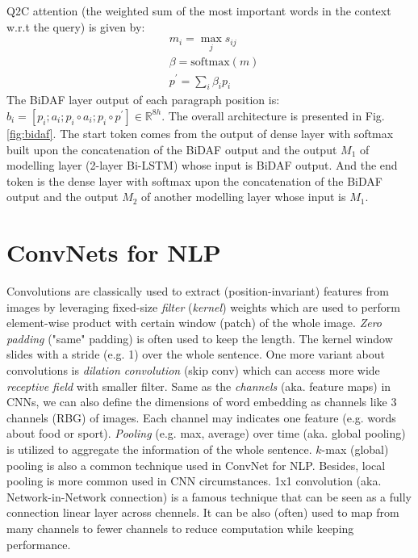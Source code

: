 Q2C attention (the weighted sum of the most important words in the context w.r.t the query) is given by:
\begin{align}
&m_i = \max_j s_{ij} \\
&\beta = \text{softmax}(m) \\
&p^\prime = \sum_i \beta_i p_i
\end{align}
The BiDAF layer output of each paragraph position is: $b_i = [p_i; a_i; p_i \circ a_i; p_i \circ p^\prime] \in \mathbb{R}^{8h}$.
The overall architecture is presented in Fig.\ref{fig:bidaf}.
The start token comes from the output of dense layer with softmax built upon the concatenation of the BiDAF output and the output $M_1$ of modelling layer (2-layer Bi-LSTM) whose input is BiDAF output.
And the end token is the dense layer with softmax upon the concatenation of the BiDAF output and the output $M_2$ of another modelling layer whose input is $M_1$.

\section{ConvNets for NLP}

Convolutions are classically used to extract (position-invariant) features from images by leveraging fixed-size \emph{filter} (\emph{kernel}) weights which are used to perform element-wise product with certain window (patch) of the whole image.
\emph{Zero padding} ("same" padding) is often used to keep the length.
The kernel window slides with a stride (e.g. 1) over the whole sentence.
One more variant about convolutions is \emph{dilation convolution} (skip conv) which can access more wide \emph{receptive field} with smaller filter.
Same as the \emph{channels} (aka. feature maps) in CNNs, we can also define the dimensions of word embedding as channels like 3 channels (RBG) of images.
Each channel may indicates one feature (e.g. words about food or sport).
\emph{Pooling} (e.g. max, average) over time (aka. global pooling) is utilized to aggregate the information of the whole sentence.
$k$-max (global) pooling is also a common technique used in ConvNet for NLP.
Besides, local pooling is more common used in CNN circumstances.
1x1 convolution (aka. Network-in-Network connection) is a famous technique that can be seen as a fully connection linear layer across chennels.
It can be also (often) used to map from many channels to fewer channels to reduce computation while keeping performance.

